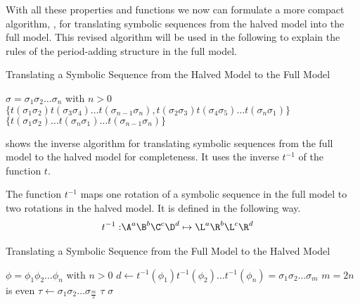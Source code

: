 With all these properties and functions we now can formulate a more compact algorithm, , for translating symbolic sequences from the halved model into the full model.
This revised algorithm will be used in the following to explain the rules of the period-adding structure in the full model.

\begin{algorithm}
	\caption{Translating a Symbolic Sequence from the Halved Model to the Full Model}\label{alg:halved.to.full}
	\begin{algorithmic}
		\Require $\sigma = \sigma_1\sigma_2 \dots \sigma_n$ with $n > 0$
		\State \Return $\{t(\sigma_1\sigma_2) t(\sigma_3\sigma_4) \dots t(\sigma_{n-1}\sigma_n), t(\sigma_2\sigma_3) t(\sigma_4\sigma_5) \dots t(\sigma_n\sigma_1)\}$
		\State \Return $\{t(\sigma_1\sigma_2) \dots t(\sigma_{n}\sigma_1) \dots t(\sigma_{n-1}\sigma_n)\}$
		\EndIf
	\end{algorithmic}
\end{algorithm}

 shows the inverse algorithm for translating symbolic sequences from the full model to the halved model for completeness.
It uses the inverse $t^{-1}$ of the function $t$.

\begin{definition}
	The function $t^{-1}$ maps one rotation of a symbolic sequence in the full model to two rotations in the halved model.
	It is defined in the following way.
	\begin{align}
		t^{-1}: & \A^a\B^b\C^c\D^d \mapsto \L^a\R^b\L^c\R^d
	\end{align}
\end{definition}

\begin{algorithm}
	\caption{Translating a Symbolic Sequence from the Full Model to the Halved Model}\label{alg:full.to.halved}
	\begin{algorithmic}
		\Require $\phi = \phi_1\phi_2 \dots \phi_n$ with $n > 0$
		\State $d \gets t^{-1}(\phi_1)t^{-1}(\phi_2) \dots t^{-1}(\phi_n) = \sigma_1\sigma_2 \dots \sigma_m$
		\Comment $m = 2n$ is even
		\State $\tau \gets \sigma_1\sigma_2 \dots \sigma_{\frac{m}{2}}$
		\If{$\sigma = \tau^2$}
		\State \Return $\tau$
		\ElsIf{$\sigma \neq \tau^2$}
		\State \Return $\sigma$
		\EndIf
	\end{algorithmic}
\end{algorithm}
